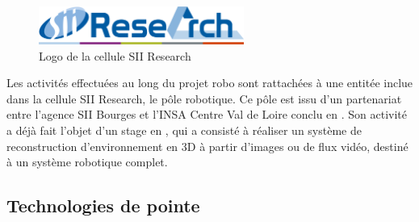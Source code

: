 {{				\begin{figure}[h]
				{
					\centering
					\includegraphics[page=1,width=0.6\textwidth]{figures/siiresearch.png}
					\caption{Logo de la cellule SII Research}
					\label{fig:sii_research}
				}
				\end{figure}
			}
			\par
			{
				Les activités effectuées au long du projet \gls{robo} sont rattachées à une entitée inclue dans la cellule SII Research, le pôle robotique. Ce pôle est issu d'un partenariat entre l'agence SII Bourges et l'INSA Centre Val de Loire conclu en . Son activité a déjà fait l'objet d'un stage en , qui a consisté à réaliser un système de reconstruction d'environnement en 3D à partir d'images ou de flux vidéo\cite{qr3d}, destiné à un système robotique complet.
			}
			
		\subsection{Technologies de pointe}
		
			
}
